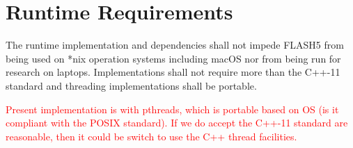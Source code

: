 \documentclass{article}
\begin{document}
%
%
%
%
%
%
%

\section{Runtime Requirements}
\begin{req}
The runtime implementation and dependencies shall not impede FLASH5 from being
used on *nix operation systems including macOS nor from being run for research
on laptops.  Implementations shall not require more than the C++-11 standard and
threading implementations shall be portable.
\end{req}

\textcolor{red}{Present implementation is with pthreads, which is portable based
on OS (is it compliant with the POSIX standard).  If we do accept the C++-11
standard are reasonable, then it could be switch to use the C++ thread
facilities.}\\
\end{document}
